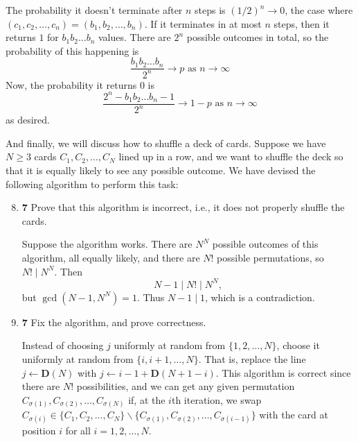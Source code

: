 \documentclass[12pt]{article}
\theoremstyle{plain}
\theoremstyle{definition}
\theoremstyle{remark}
\newcommand{\pts}[1]{\lbrack\textbf{#1}\rbrack}
\begin{document}
\begin{enumerate}
\begin{tcolorbox}
The probability it doesn't terminate after $n$ steps is $(1/2)^n\to0$, the case where $(c_1,c_2,\dots,c_n)=(b_1,b_2,\dots,b_n)$. If it terminates in at most $n$ steps, then it returns $1$ for $b_1b_2\dots b_n$ values. There are $2^n$ possible outcomes in total, so the probability of this happening is \[\frac{b_1b_2\dots b_n}{2^n}\to p\text{ as }n\to\infty\] Now, the probability it returns $0$ is \[\frac{2^n-b_1b_2\dots b_n-1}{2^n}\to1-p\text{ as }n\to\infty\] as desired.
\end{tcolorbox}
\end{enumerate}

\newpage

And finally, we will discuss how to shuffle a deck of cards. Suppose we have $N\ge3$ cards $C_1,C_2,\dots,C_N$ lined up in a row, and we want to shuffle the deck so that it is equally likely to see any possible outcome. We have devised the following algorithm to perform this task:

\begin{algorithm}
\DontPrintSemicolon
{}
\end{algorithm}

\vspace{-10pt}

\begin{enumerate}
\setcounter{enumi}{7}

\item \pts{7} Prove that this algorithm is incorrect, i.e., it does not properly shuffle the cards.

\begin{tcolorbox}
Suppose the algorithm works.  There are $N^N$ possible outcomes of this algorithm, all equally likely, and there are $N!$ possible permutations, so $N!\mid N^N$.  Then \[N-1\mid N!\mid N^N,\] but $\gcd(N-1,N^N)=1$.  Thus $N-1\mid 1$, which is a contradiction.
\end{tcolorbox}

\item \pts{7} Fix the algorithm, and prove correctness.

\begin{tcolorbox}
Instead of choosing $j$ uniformly at random from $\{1,2,\dots,N\}$, choose it uniformly at random from $\{i,i+1,\dots,N\}$. That is, replace the line $j\gets\textbf{D}(N)$ with $j\gets i-1+\textbf{D}(N+1-i)$. This algorithm is correct since there are $N!$ possibilities, and we can get any given permutation $C_{\sigma(1)},C_{\sigma(2)},\dots,C_{\sigma(N)}$ if, at the $i$th iteration, we swap $C_{\sigma(i)}\in\{C_1,C_2,\dots,C_N\}\backslash\{C_{\sigma(1)},C_{\sigma(2)},\dots,C_{\sigma(i-1)}\}$ with the card at position $i$ for all $i=1,2,\dots,N$.
\end{tcolorbox}
\end{enumerate}
\end{document}
